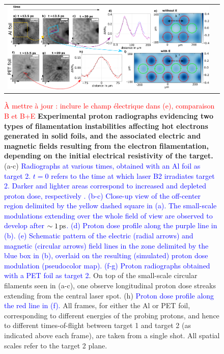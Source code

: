 \documentclass[aps,twocolumn,showpacs,superscriptaddress]{revtex4}
\begin{document}
\begin{figure}[tbh!]
\begin{tabular}{cc}
\includegraphics[scale = 0.6]{panel_v6_woE.png}
\end{tabular}
 \caption{\label{fig:radio} 
\textcolor{red}{\`A mettre \`a jour : inclure le champ \'electrique dans (e),  comparaison B et B+E}
\textbf{Experimental proton radiographs evidencing two types of filamentation instabilities affecting hot electrons generated in solid foils, and the associated electric and magnetic fields resulting from the electron filamentation, depending on the initial electrical resistivity of the target.}
(a-c) \textcolor{blue}{Radiographs at various times, obtained with an Al foil as target 2. $t=0$ refers to the time at which laser B2 irradiates target 2. Darker and lighter areas correspond to increased and depleted proton dose, respectively \cite{RSI_Albertazzi_2015}. 
(b-c) Close-up view of the off-center region delimited by the yellow dashed square in (a). The small-scale modulations extending over the whole field of view are observed to develop after $\sim 1\,\rm ps$.
(d) Proton dose profile along the purple line in (b).
(e) Schematic pattern of the electric (radial arrows) and magnetic (circular arrows) field lines in the zone delimited by the blue box in (b), overlaid on the resulting (simulated) proton dose modulation (pseudocolor map). 
(f-g) Proton radiographs obtained with a PET foil as target 2}. On top of the small-scale circular filaments seen in (a-c), one observe longitudinal proton dose streaks extending from the central laser spot. 
(h) \textcolor{blue}{Proton dose profile along the red line in (f).}
All frames, for either the Al or PET foil, corresponding to different energies of the probing protons, and hence to different times-of-flight between target 1 and target 2 (as indicated above each frame), are taken from a single shot. All spatial scales refer to the target 2 plane.
}
\end{figure}
\end{document}
